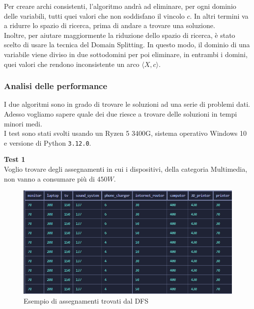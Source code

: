 \documentclass[12pt, letterpaper]{article}
\begin{document}
\noindent Per creare archi consistenti, l'algoritmo andrà ad eliminare, per ogni dominio delle variabili, tutti
quei valori che non soddisfano il vincolo $c$. In altri termini va a ridurre lo spazio di ricerca, prima di
andare a trovare una soluzione. \\

\noindent Inoltre, per aiutare maggiormente la riduzione dello spazio di ricerca, è stato scelto di usare
la tecnica del Domain Splitting. In questo modo, il dominio di una variabile viene diviso in due sottodomini
per poi eliminare, in entrambi i domini, quei valori che rendono inconsistente un arco $\langle X, c \rangle$.

\subsubsection{Analisi delle performance}

I due algoritmi sono in grado di trovare le soluzioni ad una serie di problemi dati. Adesso vogliamo sapere quale
dei due riesce a trovare delle soluzioni in tempi minori medi. \\

\noindent I test sono stati svolti usando un Ryzen 5 3400G, sistema operativo Windows 10 e
versione di Python \texttt{3.12.0}. \pagebreak


\noindent \textbf{Test 1} \\

\noindent Voglio trovare degli assegnamenti in cui i dispositivi, della
categoria Multimedia, non vanno a consumare più di $450W$.

\begin{figure}[h]
      \centering
      \includegraphics[scale=0.65]{assegnmanenti-dfs.png}
      \caption{Esempio di assegnamenti trovati dal DFS}
\end{figure}
\end{document}
